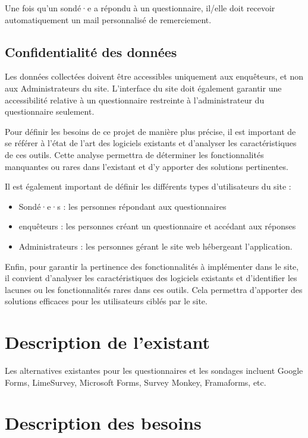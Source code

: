 \documentclass{article}
\begin{document}
Une fois qu'un sondé·e a répondu à un questionnaire, il/elle doit recevoir automatiquement un mail personnalisé de remerciement.

\subsection{Confidentialité des données}

Les données collectées doivent être accessibles uniquement aux enquêteurs, et non aux Administrateurs du site. L'interface du site doit également garantir une accessibilité relative à un questionnaire restreinte à l’administrateur du questionnaire seulement.

Pour définir les besoins de ce projet de manière plus précise, il est important de se référer à l'état de l'art des logiciels existants et d'analyser les caractéristiques de ces outils. Cette analyse permettra de déterminer les fonctionnalités manquantes ou rares dans l'existant et d'y apporter des solutions pertinentes.

Il est également important de définir les différents types d'utilisateurs du site :

\begin{itemize}
\item Sondé·e·s : les personnes répondant aux questionnaires
\item enquêteurs : les personnes créant un questionnaire et accédant aux réponses
\item Administrateurs : les personnes gérant le site web hébergeant l'application.
\end{itemize}

Enfin, pour garantir la pertinence des fonctionnalités à implémenter dans le site, il convient d'analyser les caractéristiques des logiciels existants et d'identifier les lacunes ou les fonctionnalités rares dans ces outils. Cela permettra d'apporter des solutions efficaces pour les utilisateurs ciblés par le site.

\section{Description de l'existant}
Les alternatives existantes pour les questionnaires et les sondages incluent Google Forms, LimeSurvey, Microsoft Forms, Survey Monkey, Framaforms, etc.
\section{Description des besoins}
\end{document}
